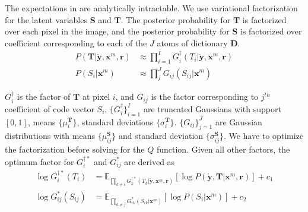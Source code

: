 The expectations in  are analytically intractable. We use variational factorization for the latent variables $\mathbf{S}$ and $\mathbf{T}$. The posterior probability for $\mathbf{T}$ is factorized over each pixel in the image, and the posterior probability for $\mathbf{S}$ is factorized over coefficient corresponding to each of the $J$ atoms of dictionary $\mathbf{D}$.
\begin{align}
P \left( \mathbf{T} | \mathbf{\mathring y}, \mathbf{x}^m, \mathbf{r} \right) &\approx \prod_{i=1}^{I} G^\dagger_i \left( T_i | \mathbf{\mathring y}, \mathbf{x}^m, \mathbf{r} \right) \label{eqn:vbFactT} \\
P \left( S_i | \mathbf{x}^m \right) &\approx \prod_{j}^{J} G_{ij} (S_{ij} | \mathbf{x}^m) \label{eqn:vbFactS}
\end{align}

$G^\dagger_i$ is the factor of $\mathbf{T}$ at pixel $i$, and $G_{ij}$ is the factor corresponding to $j^{th}$ coefficient of code vector $S_i$. $\lbrace G^\dagger_i \rbrace_{i=1}^{I}$ are truncated Gaussians with support $\left[0, 1 \right]$, means $\lbrace \mu^\mathbf{T}_i \rbrace$,  standard deviations $\lbrace \sigma^\mathbf{T}_i \rbrace$. $\lbrace G_{ij} \rbrace_{j=1}^{J}$ are Gaussian distributions with means $ \lbrace \mu^{\mathbf{S}}_{ij} \rbrace $ and standard deviation $ \lbrace \sigma^{\mathbf{S}}_{ij} \rbrace $. We have to optimize the factorization before solving for the $Q$ function. Given all other factors, the optimum factor for $G^{\dagger*}_i$ and $G^*_{ij}$ are derived as
\begin{align}
\log G^{\dagger*}_i (T_i) &= \mathbb{E}_{ \prod_{k \neq i} G^{\dagger*}_k \left( T_k | \mathbf{\mathring y}, \mathbf{x}^m, \mathbf{r} \right) } \left[ \log P \left( \mathbf{\mathring y}, \mathbf{T} | \mathbf{x}^m, \mathbf{r} \right) \right] + c_1 \label{eqn:solveFactT} \\
\log G_{ij}^* \left( S_{ij} \right) &= \mathbb{E}_{ \prod_{k \neq j} G^*_{ik} \left( S_{ik} | \mathbf{x}^m \right) } \left[ \log P \left( S_i | \mathbf{x}^m \right)\right] + c_2 \label{eqn:solveFactS}
\end{align}


